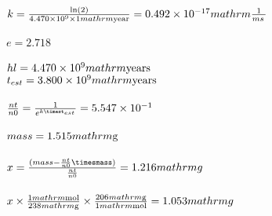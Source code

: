 \documentclass{article}
\begin{document}
\\$k=\frac{\text{ln}(2)}{4.470\times10^{9}\times1\\mathrm{\mathrm{year}}}=0.492\times10^{-17}\\mathrm{\frac{1}{ms\,}}$\\
\\$e=2.718$\\
\\$hl=4.470\times10^{9}\\mathrm{\mathrm{years}}$\\
$t_{est}=3.800\times10^{9}\\mathrm{\mathrm{years}}$\\
\\$\frac{nt}{n0}=\frac{1}{e^{k\timest_{est}}}=5.547\times10^{-1}$\\
\\$mass=1.515\\mathrm{\mathrm{g}}$\\
\\$x=\frac{(mass-\frac{nt}{n0}\timesmass)}{\frac{nt}{n0}}=1.216\\mathrm{g\,}$\\
\\$x\times\frac{1\\mathrm{\mathrm{mol}}}{238\\mathrm{\mathrm{g}}}\times\frac{206\\mathrm{\mathrm{g}}}{1\\mathrm{\mathrm{mol}}}=1.053\\mathrm{g\,}$\\
\end{document}
